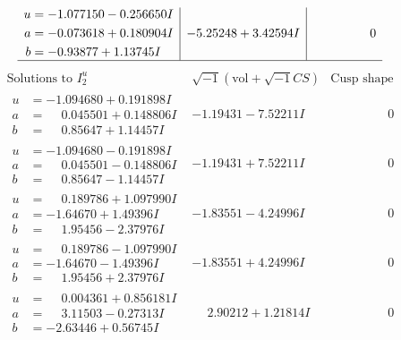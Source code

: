 \documentclass[1p]{elsarticle_modified}
\theoremstyle{definition}
\newcommand{\I}{\sqrt{-1}}
\begin{document}
$$\begin{array}{c|c|c}
\begin{aligned}
u &= -1.077150 - 0.256650 I \\
a &= -0.073618 + 0.180904 I \\
b &= -0.93877 + 1.13745 I\end{aligned}
 & -5.25248 + 3.42594 I & \phantom{-0.000000 } 0\\
 \hline 
 \end{array}$$\newpage$$\begin{array}{c|c|c}  
\text{Solutions to }I^u_{2}& \I (\text{vol} + \sqrt{-1}CS) & \text{Cusp shape}\\
 \hline 
\begin{aligned}
u &= -1.094680 + 0.191898 I \\
a &= \phantom{-}0.045501 + 0.148806 I \\
b &= \phantom{-}0.85647 + 1.14457 I\end{aligned}
 & -1.19431 - 7.52211 I & \phantom{-0.000000 } 0 \\ \hline\begin{aligned}
u &= -1.094680 - 0.191898 I \\
a &= \phantom{-}0.045501 - 0.148806 I \\
b &= \phantom{-}0.85647 - 1.14457 I\end{aligned}
 & -1.19431 + 7.52211 I & \phantom{-0.000000 } 0 \\ \hline\begin{aligned}
u &= \phantom{-}0.189786 + 1.097990 I \\
a &= -1.64670 + 1.49396 I \\
b &= \phantom{-}1.95456 - 2.37976 I\end{aligned}
 & -1.83551 - 4.24996 I & \phantom{-0.000000 } 0 \\ \hline\begin{aligned}
u &= \phantom{-}0.189786 - 1.097990 I \\
a &= -1.64670 - 1.49396 I \\
b &= \phantom{-}1.95456 + 2.37976 I\end{aligned}
 & -1.83551 + 4.24996 I & \phantom{-0.000000 } 0 \\ \hline\begin{aligned}
u &= \phantom{-}0.004361 + 0.856181 I \\
a &= \phantom{-}3.11503 - 0.27313 I \\
b &= -2.63446 + 0.56745 I\end{aligned}
 & \phantom{-}2.90212 + 1.21814 I & \phantom{-0.000000 } 0 \\ \hline\begin{aligned}

\end{aligned}
\end{array}$$
\end{document}
